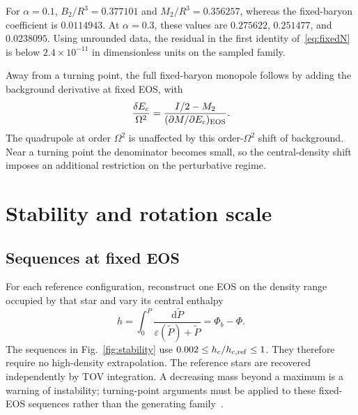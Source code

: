 \documentclass[journal,a4paper]{IEEEtran}
\newcommand{\dd}{\mathrm d}
\begin{document}
For $\alpha=0.1$, $B_2/R^3=0.377101$ and $M_2/R^3=0.356257$, whereas the fixed-baryon coefficient is $0.0114943$. At $\alpha=0.3$, these values are $0.275622$, $0.251477$, and $0.0238095$. Using unrounded data, the residual in the first identity of~\eqref{eq:fixedN} is below $2.4\times10^{-11}$ in dimensionless units on the sampled family.

Away from a turning point, the full fixed-baryon monopole follows by adding the background derivative at fixed EOS, with
\begin{equation}
 \frac{\delta E_c}{\Omega^2}=
 \frac{I/2-M_2}{(\partial M/\partial E_c)_{\rm EOS}}.
\end{equation}
The quadrupole at order $\Omega^2$ is unaffected by this order-$\Omega^2$ shift of background. Near a turning point the denominator becomes small, so the central-density shift imposes an additional restriction on the perturbative regime.

\section{Stability and rotation scale}
\subsection{Sequences at fixed EOS}
For each reference configuration, reconstruct one EOS on the density range occupied by that star and vary its central enthalpy
\begin{equation}
 h=\int_0^P\frac{\dd\widetilde P}{\varepsilon(\widetilde P)+\widetilde P}
   =\Phi_b-\Phi.
\end{equation}
The sequences in Fig.~\ref{fig:stability} use $0.002\le h_c/h_{c,\rm ref}\le1$. They therefore require no high-density extrapolation. The reference stars are recovered independently by TOV integration. A decreasing mass beyond a maximum is a warning of instability; turning-point arguments must be applied to these fixed-EOS sequences rather than the generating family~\cite{btm,fis}.
\end{document}
